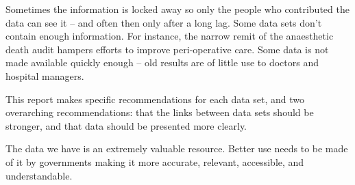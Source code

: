\documentclass[FrontPage]{grattan}
\begin{document}
\begin{overview}
Sometimes the information is locked away so only the people who contributed the data can see it – and often then only after a long lag. Some data sets don’t contain enough information. For instance, the narrow remit of the anaesthetic death audit hampers efforts to improve peri-operative care. Some data is not made available quickly enough – old results are of little use to doctors and hospital managers. 

This report makes specific recommendations for each data set, and two overarching recommendations: that the links between data sets should be stronger, and that data should be presented more clearly.

The data we have is an extremely valuable resource. Better use needs to be made of it by governments making it more accurate, relevant, accessible, and understandable.
\end{overview}
\end{document}
